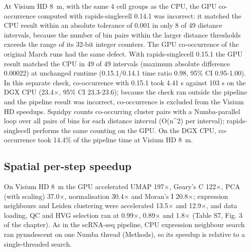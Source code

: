\documentclass[runningheads]{llncs}
\begin{document}
At Visium HD 8~\textmu{}m, with the same 4 cell groups as the CPU, the GPU co-occurrence computed with rapids-singlecell 0.14.1 was incorrect: it matched the CPU result within an absolute tolerance of 0.001 in only 8 of 49 distance intervals, because the number of bin pairs within the larger distance thresholds exceeds the range of its 32-bit integer counters.
The GPU co-occurrence of the original March runs had the same defect.
With rapids-singlecell 0.15.1 the GPU result matched the CPU in 49 of 49 intervals (maximum absolute difference 0.00022) at unchanged runtime (0.15.1/0.14.1 time ratio 0.98, 95\% CI 0.95-1.00).
In this separate check, co-occurrence with 0.15.1 took 4.41 s against 103 s on the DGX CPU (23.4$\times$, 95\% CI 23.3-23.6); because the check ran outside the pipeline and the pipeline result was incorrect, co-occurrence is excluded from the Visium HD speedups.
Squidpy counts co-occurring cluster pairs with a Numba-parallel loop over all pairs of bins for each distance interval (O(n\^{}2) per interval); rapids-singlecell performs the same counting on the GPU.
On the DGX CPU, co-occurrence took 14.4\% of the pipeline time at Visium HD 8~\textmu{}m.

\hypertarget{spatial-per-step-speedup}{%
\subsection{Spatial per-step speedup}\label{spatial-per-step-speedup}}

On Visium HD 8~\textmu{}m the GPU accelerated UMAP 197$\times$, Geary's C 122$\times$, PCA (with scaling) 37.0$\times$, normalisation 30.4$\times$ and Moran's I 20.8$\times$; expression neighbours and Leiden clustering were accelerated 13.5$\times$ and 12.9$\times$, and data loading, QC and HVG selection ran at 0.99$\times$, 0.89$\times$ and 1.8$\times$ (Table S7, Fig. 3 of the chapter).
As in the scRNA-seq pipeline, CPU expression neighbour search ran pynndescent on one Numba thread (Methods), so its speedup is relative to a single-threaded search.
\end{document}
